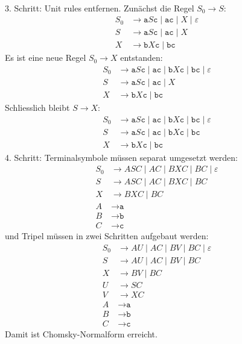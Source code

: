 \begin{loesung}
\begin{teilaufgaben}
\begin{align*}
\end{align*}
3. Schritt: Unit rules entfernen.
Zunächst die Regel $S_0\to S$:
\begin{align*}
S_0 & \to
\texttt{a} S \texttt{c} \;|\; \texttt{ac} \;|\; X \;|\; \varepsilon
\\
S & \to
\texttt{a} S \texttt{c} \;|\; \texttt{ac} \;|\; X
\\
X & \to \texttt{b}X\texttt{c} \;|\; \texttt{bc}
\end{align*}
Es ist eine neue Regel $S_0\to X$ entstanden:
\begin{align*}
S_0 & \to
\texttt{a} S \texttt{c} \;|\; \texttt{ac} \;|\;
\texttt{b}X\texttt{c} \;|\; \texttt{bc}
\;|\; \varepsilon
\\
S & \to
\texttt{a} S \texttt{c} \;|\; \texttt{ac} \;|\; X
\\
X & \to \texttt{b}X\texttt{c} \;|\; \texttt{bc}
\end{align*}
Schliesslich bleibt $S\to X$:
\begin{align*}
S_0 & \to
\texttt{a} S \texttt{c} \;|\; \texttt{ac} \;|\;
\texttt{b}X\texttt{c} \;|\; \texttt{bc}
\;|\; \varepsilon
\\
S & \to
\texttt{a} S \texttt{c} \;|\; \texttt{ac} \;|\;
\texttt{b}X\texttt{c} \;|\; \texttt{bc}
\\
X & \to \texttt{b}X\texttt{c} \;|\; \texttt{bc}
\end{align*}
4. Schritt: Terminalsymbole müssen separat umgesetzt werden:
\begin{align*}
S_0 & \to
ASC \;|\; AC \;|\;
BXC \;|\; BC
\;|\; \varepsilon
\\
S & \to
A S C \;|\; AC \;|\;
BXC \;|\; BC
\\
X & \to BXC \;|\; BC
\\
A&\to \texttt{a} \\
B&\to \texttt{b} \\
C&\to \texttt{c}
\end{align*}
und Tripel müssen in zwei Schritten aufgebaut werden:
\begin{align*}
S_0 & \to AU \;|\; AC \;|\; BV \;|\; BC \;|\; \varepsilon
\\
S & \to AU \;|\; AC \;|\; BV \;|\; BC
\\
X & \to BV \;|\; BC
\\
U&\to SC
\\
V & \to XC
\\
A&\to \texttt{a} \\
B&\to \texttt{b} \\
C&\to \texttt{c}
\end{align*}
Damit ist Chomsky-Normalform erreicht.
\qedhere
\end{teilaufgaben}
\end{loesung}

